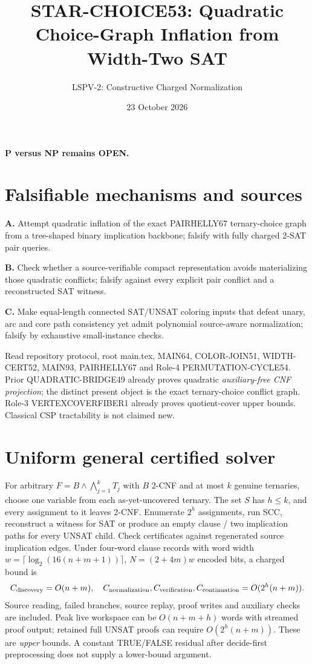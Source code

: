 \documentclass[11pt]{article}
\title{STAR-CHOICE53: Quadratic Choice-Graph Inflation from Width-Two SAT}
\author{LSPV-2: Constructive Charged Normalization}
\date{23 October 2026}
\begin{document}
\maketitle
\begin{center}\textbf{P versus NP remains OPEN.}\end{center}
\section{Falsifiable mechanisms and sources}
\noindent\textbf{A.} Attempt quadratic inflation of the exact PAIRHELLY67 ternary-choice graph from a tree-shaped binary implication backbone; falsify with fully charged 2-SAT pair queries.\par
\noindent\textbf{B.} Check whether a source-verifiable compact representation avoids materializing those quadratic conflicts; falsify against every explicit pair conflict and a reconstructed SAT witness.\par
\noindent\textbf{C.} Make equal-length connected SAT/UNSAT coloring inputs that defeat unary, arc and core path consistency yet admit polynomial source-aware normalization; falsify by exhaustive small-instance checks.\par
Read repository protocol, root main.tex, MAIN64, COLOR-JOIN51, WIDTH-CERT52, MAIN93, PAIRHELLY67 and Role-4 PERMUTATION-CYCLE54. Prior QUADRATIC-BRIDGE49 already proves quadratic \emph{auxiliary-free CNF projection}; the distinct present object is the exact ternary-choice conflict graph. Role-3 VERTEXCOVERFIBER1 already proves quotient-cover upper bounds. Classical CSP tractability is not claimed new.
\section{Uniform general certified solver}
For arbitrary $F=B\wedge\bigwedge_{j=1}^kT_j$ with $B$ 2-CNF and at most $k$ genuine ternaries, choose one variable from each as-yet-uncovered ternary. The set $S$ has $h\le k$, and every assignment to it leaves 2-CNF. Enumerate $2^h$ assignments, run SCC, reconstruct a witness for SAT or produce an empty clause / two implication paths for every UNSAT child. Check certificates against regenerated source implication edges. Under four-word clause records with word width $w=\lceil\log_2(16(n+m+1))\rceil$, $N=(2+4m)w$ encoded bits, a charged bound is
\[
C_{\rm discovery}=O(n+m),\quad
C_{\rm normalization},C_{\rm verification},C_{\rm continuation}
=O(2^h(n+m)).
\]
Source reading, failed branches, source replay, proof writes and auxiliary checks are included. Peak live workspace can be $O(n+m+h)$ words with streamed proof output; retained full UNSAT proofs can require $O(2^h(n+m))$. These are \emph{upper} bounds. A constant TRUE/FALSE residual after decide-first preprocessing does not supply a lower-bound argument.
\end{document}
